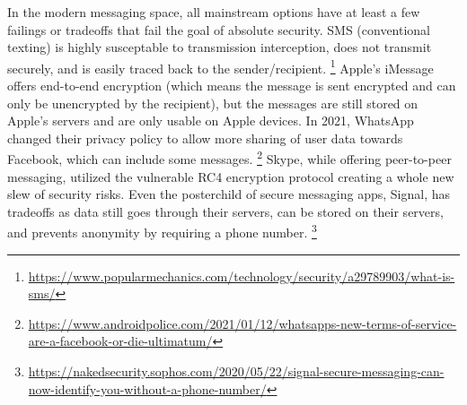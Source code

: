 \documentclass[titlepage]{article}
\begin{document}
    In the modern messaging space, all mainstream options have at least a few failings or tradeoffs that fail the goal of absolute security. 
    SMS (conventional texting) is highly susceptable to transmission interception, does not transmit securely, and is easily traced back to the sender/recipient.
    \footnote{\url{https://www.popularmechanics.com/technology/security/a29789903/what-is-sms/}}
    Apple's iMessage offers end-to-end encryption (which means the message is sent encrypted and can only be unencrypted by the recipient), but the messages are still stored on Apple's servers and are only usable on Apple devices.
    In 2021, WhatsApp changed their privacy policy to allow more sharing of user data towards Facebook, which can include some messages. 
    \footnote{\url{https://www.androidpolice.com/2021/01/12/whatsapps-new-terms-of-service-are-a-facebook-or-die-ultimatum/}}
    Skype, while offering peer-to-peer messaging, utilized the vulnerable RC4 encryption protocol creating a whole new slew of security risks.
    Even the posterchild of secure messaging apps, Signal, has tradeoffs as data still goes through their servers, can be stored on their servers, and prevents anonymity by requiring a phone number.
    \footnote{\url{https://nakedsecurity.sophos.com/2020/05/22/signal-secure-messaging-can-now-identify-you-without-a-phone-number/}}\\
\end{document}
